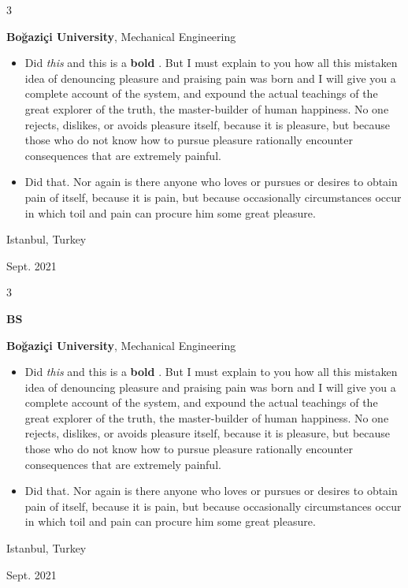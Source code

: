 \documentclass[10pt, letterpaper]{article}
\newenvironment{highlights}{
    \begin{itemize}[
        topsep=0.10 cm,
        parsep=0.10 cm,
        partopsep=0pt,
        itemsep=0pt,
        leftmargin=0.4 cm + 10pt
    ]
}{
    \end{itemize}
} %
\newenvironment{threecolentry}[3][]{
    \onecolentry
    \def\thirdColumn{#3}
    \setcolumnwidth{1 cm, \fill, 4.5 cm}
    \begin{paracol}{3}
    {\raggedright #2} \switchcolumn
}{
    \switchcolumn \raggedleft \thirdColumn
    \end{paracol}
    \endonecolentry
} %
\let\hrefWithoutArrow\href
\renewcommand{\href}[2]{\hrefWithoutArrow{#1}{\mbox{\ifthenelse{\equal{#2}{}}{ }{#2 }\raisebox{.15ex}{\footnotesize \faExternalLink*}}}}
\begin{document}
        \vspace{0.2 cm}

        \begin{threecolentry}{\textbf{}}{
            Istanbul, Turkey

        Sept. 2021
        }
            \textbf{Boğaziçi University}, Mechanical Engineering
            \begin{highlights}
                \item Did \textit{this} and this is a \textbf{bold} \href{https://example.com}{link}. But I must explain to you how all this mistaken idea of denouncing pleasure and praising pain was born and I will give you a complete account of the system, and expound the actual teachings of the great explorer of the truth, the master-builder of human happiness. No one rejects, dislikes, or avoids pleasure itself, because it is pleasure, but because those who do not know how to pursue pleasure rationally encounter consequences that are extremely painful.
                \item Did that. Nor again is there anyone who loves or pursues or desires to obtain pain of itself, because it is pain, but because occasionally circumstances occur in which toil and pain can procure him some great pleasure.
            \end{highlights}
        \end{threecolentry}

        \vspace{0.2 cm}

        \begin{threecolentry}{\textbf{BS}}{
            Istanbul, Turkey

        Sept. 2021
        }
            \textbf{Boğaziçi University}, Mechanical Engineering
            \begin{highlights}
                \item Did \textit{this} and this is a \textbf{bold} \href{https://example.com}{link}. But I must explain to you how all this mistaken idea of denouncing pleasure and praising pain was born and I will give you a complete account of the system, and expound the actual teachings of the great explorer of the truth, the master-builder of human happiness. No one rejects, dislikes, or avoids pleasure itself, because it is pleasure, but because those who do not know how to pursue pleasure rationally encounter consequences that are extremely painful.
                \item Did that. Nor again is there anyone who loves or pursues or desires to obtain pain of itself, because it is pain, but because occasionally circumstances occur in which toil and pain can procure him some great pleasure.
            \end{highlights}
        \end{threecolentry}
\end{document}

